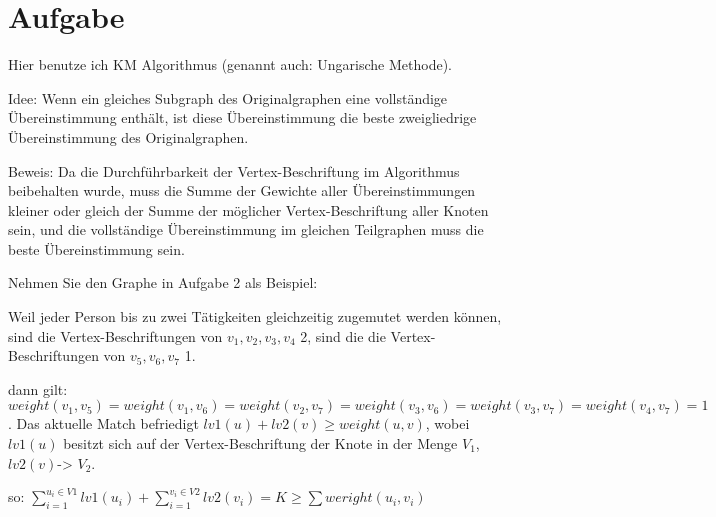 \documentclass[fleqn]{article}
\begin{document}
\section{Aufgabe}

Hier benutze ich KM Algorithmus (genannt auch: Ungarische Methode).

Idee: Wenn ein gleiches Subgraph des Originalgraphen eine vollständige Übereinstimmung enthält, ist diese Übereinstimmung die beste zweigliedrige Übereinstimmung des Originalgraphen.

Beweis: Da die Durchführbarkeit der Vertex-Beschriftung im Algorithmus beibehalten wurde, muss die Summe der Gewichte aller Übereinstimmungen kleiner oder gleich der Summe der möglicher Vertex-Beschriftung aller Knoten sein, und die vollständige Übereinstimmung im gleichen Teilgraphen muss die beste Übereinstimmung sein.

Nehmen Sie den Graphe in Aufgabe 2 als Beispiel:

Weil jeder Person bis zu zwei Tätigkeiten gleichzeitig zugemutet werden können, sind die Vertex-Beschriftungen von $v_1, v_2, v_3, v_4$ 2, sind die die Vertex-Beschriftungen von $v_5, v_6, v_7$ 1.

dann gilt: $weight(v_1,v_5) = weight(v_1,v_6) = weight(v_2,v_7) = weight(v_3,v_6) = weight(v_3,v_7) = weight(v_4,v_7) = 1$.
Das aktuelle Match befriedigt $lv1(u) + lv2(v) \geq weight(u,v)$, wobei $lv1(u)$ besitzt sich auf der Vertex-Beschriftung der Knote in der Menge $V_1$, $lv2(v)$-> $V_2$.

so: $\sum_{i=1}^{u_i \in V1}lv1(u_i) + \sum_{i=1}^{v_i \in V2}lv2(v_i) = K \geq \sum weright(u_i,v_i)$
\end{document}
